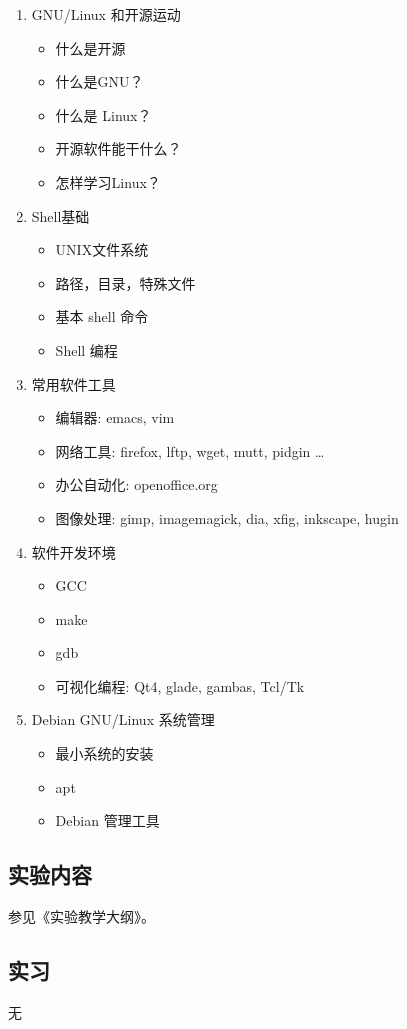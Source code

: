\documentclass[12pt,a4paper]{article}
\begin{document}
\begin{enumerate}
\item GNU/Linux 和开源运动
\begin{itemize}
\item 什么是开源
\item 什么是GNU？
\item 什么是 Linux？
\item 开源软件能干什么？
\item 怎样学习Linux？
\end{itemize}
\item Shell基础
\begin{itemize}
\item UNIX文件系统
\item 路径，目录，特殊文件
\item 基本 shell 命令
\item Shell 编程
\end{itemize}
\item 常用软件工具
\begin{itemize}
\item 编辑器: emacs, vim
\item 网络工具: firefox, lftp, wget, mutt, pidgin \ldots{}
\item 办公自动化: openoffice.org
\item 图像处理: gimp, imagemagick, dia, xfig, inkscape, hugin
\end{itemize}
\item 软件开发环境
\begin{itemize}
\item GCC
\item make
\item gdb
\item 可视化编程: Qt4, glade, gambas, Tcl/Tk
\end{itemize}
\item Debian GNU/Linux 系统管理
\begin{itemize}
\item 最小系统的安装
\item apt
\item Debian 管理工具
\end{itemize}
\end{enumerate}
\subsection{实验内容}
参见《实验教学大纲》。

\subsection{实习}
无
\end{document}
